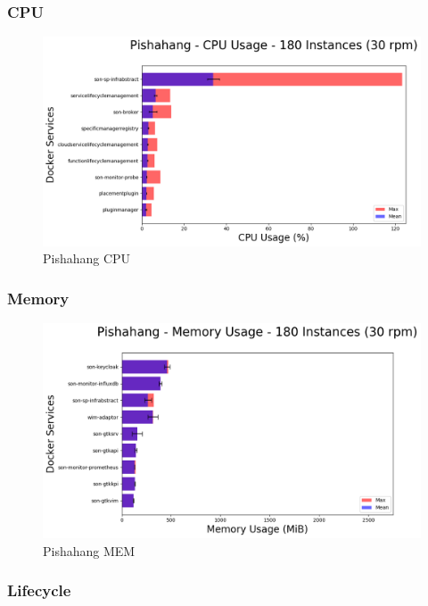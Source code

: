\subsubsection{CPU}

\begin{figure}[h]
	\centering
	\includegraphics[width=0.7\linewidth]{../figures/scalability_graphs/Horizontal-Docker-Graphs/pishahang/cirros_case1_180-CPU}
	\caption{Pishahang CPU}
	\label{fig:cirroscase1180-cpu}
\end{figure}

\subsubsection{Memory}

\begin{figure}[h]
	\centering
	\includegraphics[width=0.7\linewidth]{../figures/scalability_graphs/Horizontal-Docker-Graphs/pishahang/cirros_case1_180-MEM}
	\caption{Pishahang MEM}
	\label{fig:cirroscase1180-mem}
\end{figure}


\subsubsection{Lifecycle}

